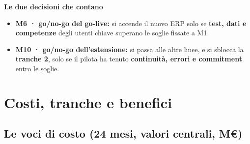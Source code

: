 \documentclass[11pt,a4paper]{article}
\begin{document}
\textbf{Le due decisioni che contano}
\begin{itemize}
\item \textbf{M6 · go/no-go del go-live:} si accende il nuovo ERP solo se \textbf{test, dati e competenze} degli utenti chiave superano le soglie fissate a M1.
\item \textbf{M10 · go/no-go dell'estensione:} si passa alle altre linee, e si sblocca la \textbf{tranche 2}, solo se il pilota ha tenuto \textbf{continuità, errori e commitment} entro le soglie.
\end{itemize}

\section{Costi, tranche e benefici}\label{sec:15}

\subsection{Le voci di costo (24 mesi, valori centrali, M€)}\label{sec:15.1}
\end{document}
